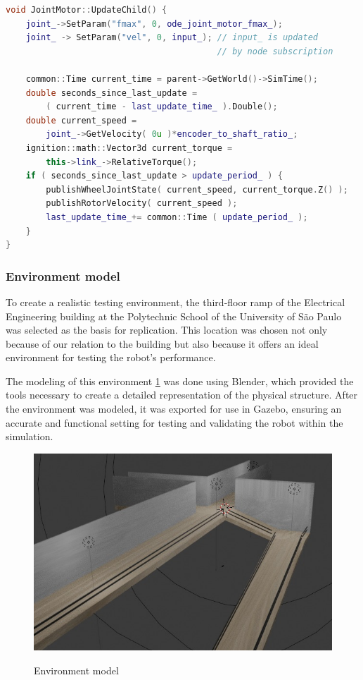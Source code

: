 \documentclass[../../monografia.tex]{subfiles}
\begin{document}
\begin{lstlisting}[language=C++, caption={Joint motor update function}]
void JointMotor::UpdateChild() {
    joint_->SetParam("fmax", 0, ode_joint_motor_fmax_);
    joint_ -> SetParam("vel", 0, input_); // input_ is updated 
                                          // by node subscription

    common::Time current_time = parent->GetWorld()->SimTime();
    double seconds_since_last_update = 
        ( current_time - last_update_time_ ).Double();
    double current_speed = 
        joint_->GetVelocity( 0u )*encoder_to_shaft_ratio_;
    ignition::math::Vector3d current_torque = 
        this->link_->RelativeTorque();
    if ( seconds_since_last_update > update_period_ ) {
        publishWheelJointState( current_speed, current_torque.Z() );
        publishRotorVelocity( current_speed );
        last_update_time_+= common::Time ( update_period_ );
    }
}
\end{lstlisting}

\subsubsection{Environment model}

To create a realistic testing environment, the third-floor ramp of the Electrical Engineering building  at the Polytechnic School of the University of São Paulo was selected as the basis for replication. This location was chosen not only because of our relation to the building but also because it offers an ideal environment for testing the robot’s performance.

The modeling of this environment \ref{fig: Environment model} was done using Blender, which provided the tools necessary to create a detailed representation of the physical structure. After the environment was modeled, it was exported for use in Gazebo, ensuring an accurate and functional setting for testing and validating the robot within the simulation.

\begin{figure}[h!]
    \caption{Environment model}
    \centering
    \includegraphics[width=16cm]{src/images/ThirdFloor.jpeg}
    \label{fig: Environment model}
\end{figure}
\end{document}

